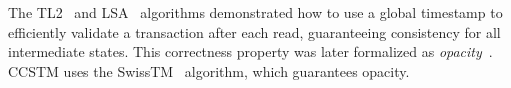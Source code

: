 The TL2~\cite{dice06tl2} and LSA~\cite{riegel06lsa} algorithms
demonstrated how to use a global timestamp to efficiently validate
a transaction after each read, guaranteeing consistency for all
intermediate states.  This correctness property was later formalized
as \textit{opacity}~\cite{guerraoui08opacity}.  CCSTM uses the
SwissTM~\cite{swisstm} algorithm, which guarantees opacity.





